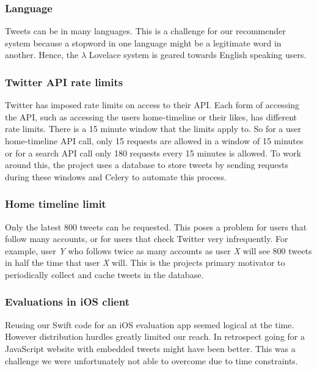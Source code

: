 \documentclass{article}
\begin{document}
\subsubsection*{Language} %
Tweets can be in many languages. This is a challenge for our recommender system because a stopword in one language might be a legitimate word in another. Hence, the $\lambda$ Lovelace system is geared towards English speaking users.


\subsubsection*{Twitter API rate limits} %
Twitter has imposed rate limits on access to their API. Each form of accessing the API, such as accessing the users home-timeline or their likes, has different rate limits. There is a 15 minute window that the limits apply to. So for a user home-timeline API call, only 15 requests are allowed in a window of 15 minutes or for a search API call only 180 requests every 15 minutes is allowed. To work around this, the project uses a database to store tweets by sending requests during these windows and Celery to automate this process.
    
\subsubsection*{Home timeline limit} %
Only the latest 800 tweets can be requested. This poses a problem for users that follow many accounts, or for users that check Twitter very infrequently. For example, user \textit{Y} who follows twice as many accounts as user \textit{X} will see 800 tweets in half the time that user \textit{X} will. This is the projects primary motivator to periodically collect and cache tweets in the database.


\subsubsection*{Evaluations in iOS client} %
Reusing our Swift code for an iOS evaluation app seemed logical at the time. However distribution hurdles greatly limited our reach. In retrospect going for a JavaScript website with embedded tweets \cite{embed-tweet} might have been better. This was a challenge we were unfortunately not able to overcome due to time constraints.
\end{document}
